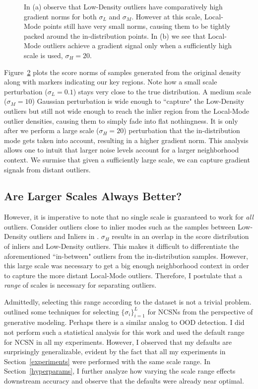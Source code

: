 \begin{figure}[tbhp]
\begin{subfigure}[b]{0.45\textwidth}
    \label{fig:score_norms_3d}
\end{subfigure}
\caption{In (a) observe that Low-Density outliers have comparatively high gradient norms for both $\sigma_{L}$ and $\sigma_{M}$. However at this scale, Local-Mode points still have very small norms, causing them to be tightly packed around the in-distribution points. In (b) we see that Local-Mode outliers achieve a gradient signal only when a sufficiently high scale is used, $\sigma_{H}=20$.}
\label{fig:norm_plots}
\end{figure}

Figure~\ref{fig:norm_plots} plots the score norms of samples generated from the original density along with markers indicating our key regions. Note how a small scale perturbation ($\sigma_{L}=0.1$) stays very close to the true distribution. A medium scale ($\sigma_{M}=10$) Gaussian perturbation is wide enough to ``capture" the Low-Density outliers but still not wide enough to reach the inlier region from the Local-Mode outlier densities, causing them to simply fade into flat nothingness. It is only after we perform a large scale ($\sigma_{H}=20$) perturbation that the in-distribution mode gets taken into account, resulting in a higher gradient norm. This analysis allows one to intuit that larger noise levels account for a larger neighborhood context. We surmise that given a sufficiently large scale, we can capture gradient signals from distant outliers.

\subsection*{Are Larger Scales Always Better?}

However, it is imperative to note that no single scale is guaranteed to work for \textit{all} outliers. Consider outliers close to inlier modes such as the samples between Low-Density outliers and Inliers in . $\sigma_H$ results in an overlap in the score distribution of inliers and Low-Density outliers. This makes it difficult to differentiate the aforementioned ``in-between" outliers from the in-distribution samples. However, this large scale was necessary to get a big enough neighborhood context in order to capture the more distant Local-Mode outliers. Therefore, I postulate that a \emph{range} of scales is necessary for separating outliers.

Admittedly, selecting this range according to the dataset is not a trivial problem. \cite{song2020improved} outlined some techniques for selecting $\{\sigma_i\}_{i=1}^L$ for NCSNs from the perspective of generative modeling. Perhaps there is a similar analog to OOD detection. I did not perform such a statistical analysis for this work and used the default range for NCSN in all my experiments. However, I observed that my defaults are surprisingly generalizable, evident by the fact that all my experiments in Section~\ref{experiments} were performed with the same scale range. In Section~\ref{hyperparams}, I further analyze how varying the scale range effects downstream accuracy and observe that the defaults were already near optimal.


